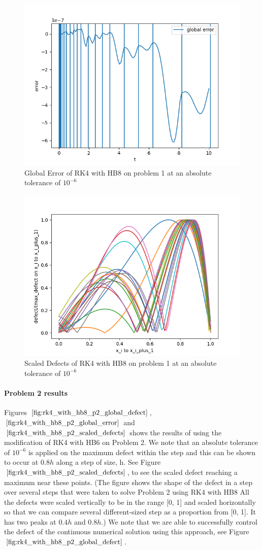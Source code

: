 \documentclass{article}
\begin{document}
\begin{figure}[H]
\centering
\includegraphics[width=0.7\linewidth]{./figures/rk4_with_hb8_p1_global_error}
\caption{Global Error of RK4 with HB8 on problem 1 at an absolute tolerance of $10^{-6}$}
\label{fig:rk4_with_hb8_p1_global_error}
\end{figure}

\begin{figure}[H]
\centering
\includegraphics[width=0.7\linewidth]{./figures/rk4_with_hb8_p1_scaled_defects}
\caption{Scaled Defects of RK4 with HB8 on problem 1 at an absolute tolerance of $10^{-6}$}
\label{fig:rk4_with_hb8_p1_scaled_defects}
\end{figure}

\paragraph{Problem 2 results}
Figures $\ref{fig:rk4_with_hb8_p2_global_defect}$, $\ref{fig:rk4_with_hb8_p2_global_error}$ and $\ref{fig:rk4_with_hb8_p2_scaled_defects}$ shows the results of using the modification of RK4 with HB6 on Problem 2. We note that an absolute tolerance of $10^{-6}$ is applied on the maximum defect within the step and this can be shown to occur at $0.8h$ along a step of size, h. See Figure $\ref{fig:rk4_with_hb8_p2_scaled_defects}$, to see the scaled defect reaching a maximum near these points. (The figure shows the shape of the defect in a step over several steps that were taken to solve Problem 2 using RK4 with HB8 All the defects were scaled vertically to be in the range [0, 1] and scaled horizontally so that we can compare several different-sized step as a proportion from [0, 1]. It has two peaks at $0.4h$ and $0.8h$.) We note that we are able to successfully control the defect of the continuous numerical solution using this approach, see Figure $\ref{fig:rk4_with_hb8_p2_global_defect}$. 
\end{document}
